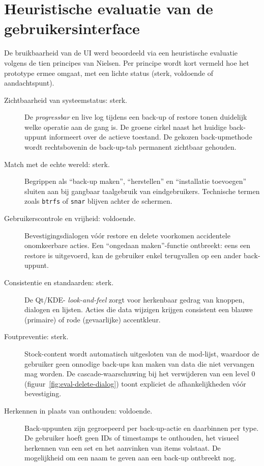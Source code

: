 \section{Heuristische evaluatie van de gebruikersinterface}
\label{sec:eval-heuristiek}

De bruikbaarheid van de UI werd beoordeeld via een heuristische evaluatie volgens de tien principes van Nielsen. Per principe wordt kort vermeld hoe het prototype ermee omgaat, met een lichte status (sterk, voldoende of aandachtspunt).

\begin{description}
    \item[Zichtbaarheid van systeemstatus: sterk.] De \textit{progressbar} en live log tijdens een back-up of restore tonen duidelijk welke operatie aan de gang is. De groene cirkel naast het huidige back-uppunt informeert over de actieve toestand. De gekozen back-upmethode wordt rechtsbovenin de back-up-tab permanent zichtbaar gehouden.
    \item[Match met de echte wereld: sterk.] Begrippen als ``back-up maken'', ``herstellen'' en ``installatie toevoegen'' sluiten aan bij gangbaar taalgebruik van eindgebruikers. Technische termen zoals \texttt{btrfs} of \texttt{snar} blijven achter de schermen.
    \item[Gebruikerscontrole en vrijheid: voldoende.] Bevestigingsdialogen vóór restore en delete voorkomen accidentele onomkeerbare acties. Een ``ongedaan maken''-functie ontbreekt: eens een restore is uitgevoerd, kan de gebruiker enkel terugvallen op een ander back-uppunt.
    \item[Consistentie en standaarden: sterk.] De Qt/KDE- \textit{look-and-feel} zorgt voor herkenbaar gedrag van knoppen, dialogen en lijsten. Acties die data wijzigen krijgen consistent een blauwe (primaire) of rode (gevaarlijke) accentkleur.
    \item[Foutpreventie: sterk.] Stock-content wordt automatisch uitgesloten van de mod-lijst, waardoor de gebruiker geen onnodige back-ups kan maken van data die niet vervangen mag worden. De cascade-waarschuwing bij het verwijderen van een level 0 (figuur~\ref{fig:eval-delete-dialog}) toont expliciet de afhankelijkheden vóór bevestiging.
    \item[Herkennen in plaats van onthouden: voldoende.] Back-uppunten zijn gegroepeerd per back-up-actie en daarbinnen per type. De gebruiker hoeft geen IDs of timestamps te onthouden, het visueel herkennen van een set en het aanvinken van items volstaat. De mogelijkheid om een naam te geven aan een back-up ontbreekt nog.

\end{description}
